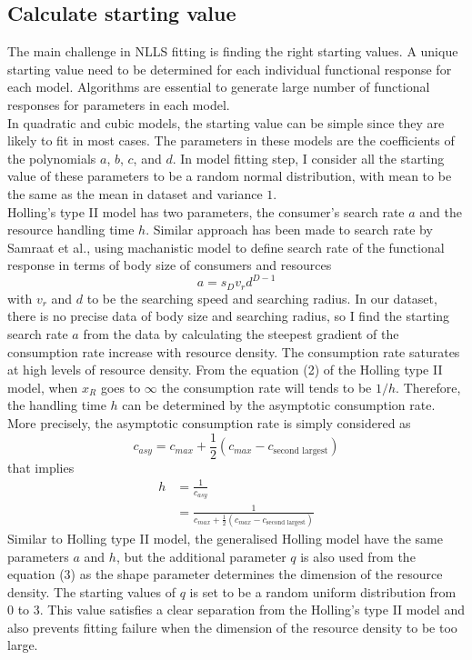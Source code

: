 \documentclass{article}[11pt,a4,twosided,doublespacing,titlepagenumber=on,numbers=endperiod]
\begin{document}
\subsection{Calculate starting value}
The main challenge in NLLS fitting is finding the right starting values. A unique starting value need to be determined for each individual functional response for each model. Algorithms are essential to generate large number of functional responses for parameters in each model.\\
\noindent
In quadratic and cubic models, the starting value can be simple since they are likely to fit in most cases. The parameters in these models are the coefficients of the polynomials $a$, $b$, $c$, and $d$. In model fitting step, I consider all the starting value of these parameters to be a random normal distribution, with mean to be the same as the mean in dataset and variance $1$.\\
\noindent
Holling's type II model has two parameters, the consumer's search rate $a$ and the resource handling time $h$. Similar approach has been made to search rate by Samraat et al.\cite{pawar2012dimensionality}, using machanistic model to define search rate of the functional response in terms of body size of consumers and resources
\begin{equation}
    a = s_D v_r d^{D-1}
\end{equation}
with $v_r$ and $d$ to be the searching speed and searching radius. In our dataset, there is no precise data of body size and searching radius, so I find the starting search rate $a$ from the data by calculating the steepest gradient of the consumption rate increase with resource density. The consumption rate saturates at high levels of resource density. From the equation (2) of the Holling type II model, when $x_R$ goes to $\infty$ the consumption rate will tends to be $1/h$. Therefore, the handling time $h$ can be determined by the asymptotic consumption rate. More precisely, the asymptotic consumption rate is simply considered as
\begin{equation}
    c_{asy} = c_{max} + \frac{1}{2} (c_{max} - c_{\text{second largest}})
\end{equation}
that implies
\begin{align*}
    h &= \frac{1}{c_{asy}}\\
      &= \frac{1}{c_{max} + \frac{1}{2} (c_{max} - c_{\text{second largest}})}
\end{align*}
Similar to Holling type II model, the generalised Holling model have the same parameters $a$ and $h$, but the additional parameter $q$ is also used from the equation (3) as the shape parameter determines the dimension of the resource density. The starting values of $q$ is set to be a random uniform distribution from 0 to 3. This value satisfies a clear separation from the Holling's type II model and also prevents fitting failure when the dimension of the resource density to be too large.
\end{document}
